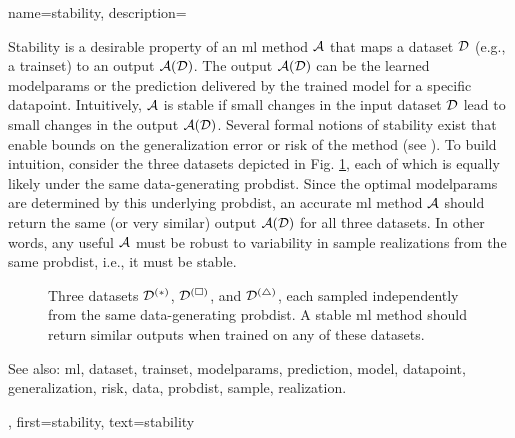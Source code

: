 {name={stability},
	description={Stability is a desirable property of an \gls{ml} method $\mathcal{A}$ that maps a 
		\gls{dataset} $\mathcal{D}$ (e.g., a \gls{trainset}) to an output $\mathcal{A}(\mathcal{D})$. The output 
		$\mathcal{A}(\mathcal{D})$ can be the learned \gls{modelparams} or the \gls{prediction} delivered 
		by the trained \gls{model} for a specific \gls{datapoint}. Intuitively, $\mathcal{A}$ is 
		stable if small changes in the input \gls{dataset} $\mathcal{D}$ lead to small changes in the 
		output $\mathcal{A}(\mathcal{D})$. Several formal notions of stability exist that enable bounds 
		on the \gls{generalization} error or \gls{risk} of the method (see \cite[Ch.~13]{ShalevMLBook}).
		To build intuition, consider the three \glspl{dataset} depicted in Fig. \ref{fig_three_data_stability_dict}, each 
		of which is equally likely under the same \gls{data}-generating \gls{probdist}. Since the 
		optimal \gls{modelparams} are determined by this underlying \gls{probdist}, an accurate 
		\gls{ml} method $\mathcal{A}$ should return the same (or very similar) output $\mathcal{A}(\mathcal{D})$ 
		for all three \glspl{dataset}. In other words, any useful $\mathcal{A}$ must be robust to 
		variability in \gls{sample} \glspl{realization} from the same \gls{probdist}, i.e., it must be stable. 
		\begin{figure}[H]
			\centering
			\caption{Three \glspl{dataset} $\mathcal{D}^{(*)}$, $\mathcal{D}^{(\square)}$, and $\mathcal{D}^{(\triangle)}$, 
				each sampled independently from the same \gls{data}-generating \gls{probdist}. A stable \gls{ml} 
				method should return similar outputs when trained on any of these \glspl{dataset}. \label{fig_three_data_stability_dict}}
		\end{figure}
		See also: \gls{ml}, \gls{dataset}, \gls{trainset}, \gls{modelparams}, \gls{prediction}, \gls{model}, \gls{datapoint}, \gls{generalization}, \gls{risk}, \gls{data}, \gls{probdist}, \gls{sample}, \gls{realization}.}, 
	first={stability}, 
	text={stability} 
}

